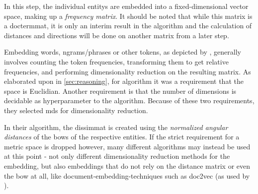 In this step, the individual \glspl{entity} are embedded into a fixed-dimensional vector space, making up a \emph{frequency matrix}. It should be noted that while this matrix is a \gls{doctermmat}, it is only an interim result in the algorithm and the calculation of distances and directions will be done on another matrix from a later step.

Embedding words, \glspl{ngram}/phrases or other tokens, as depicted by \cite{Turney2010,Lowe}, generally involves counting the token frequencies, transforming them to get relative frequencies, and performing dimensionality reduction on the resulting matrix. As elaborated upon in \autoref{sec:reasoning}, for  algorithm it was a requirement that the space is Euclidian. Another requirement is that the number of dimensions is decidable as hyperparameter to the algorithm. Because of these two requirements, they selected \gls{mds} for dimensionality reduction.

In their algorithm, the \gls{dissimmat} is created using the \emph{normalized angular distances} of the \glspl{bow} of the respective entities. If the strict requirement for a metric space is dropped however, many different algorithms may instead be used at this point - not only different dimensionality reduction methods for the embedding, but also embeddings that do not rely on the distance matrix or even the \gls{bow} at all, like document-embedding-techniques such as \gls{doc2vec} \cite{Le2014} (as \eg used by \cite{Alshaikh2020}).







